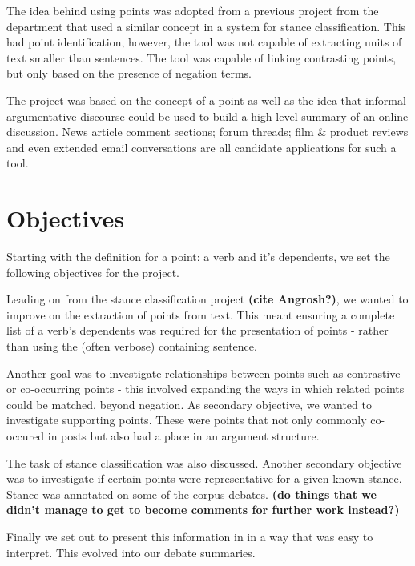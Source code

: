     The idea behind using points was adopted from a previous project from the department that used a similar concept in a system for stance classification. This had point identification, however, the tool was not capable of extracting units of text smaller than sentences. The tool was capable of linking contrasting points, but only based on the presence of negation terms.

    The project was based on the concept of a point as well as the idea that informal argumentative discourse could be used to build a high-level summary of an online discussion. News article comment sections; forum threads; film \& product reviews and even extended email conversations are all candidate applications for such a tool.

  \section{Objectives}
    Starting with the definition for a point: a verb and it's dependents, we set the following objectives for the project.

    Leading on from the stance classification project \textbf{(cite Angrosh?)}, we wanted to improve on the extraction of points from text. This meant ensuring a complete list of a verb's dependents was required for the presentation of points - rather than using the (often verbose) containing sentence.

    Another goal was to investigate relationships between points such as contrastive or co-occurring points - this involved expanding the ways in which related points could be matched, beyond negation. As secondary objective, we wanted to investigate supporting points. These were points that not only commonly co-occured in posts but also had a place in an argument structure.

    The task of stance classification was also discussed. Another secondary objective was to investigate if certain points were representative for a given known stance. Stance was annotated on some of the corpus debates.
    \textbf{(do things that we didn't manage to get to become comments for further work instead?)}

    Finally we set out to present this information in in a way that was easy to interpret. This evolved into our debate summaries.
